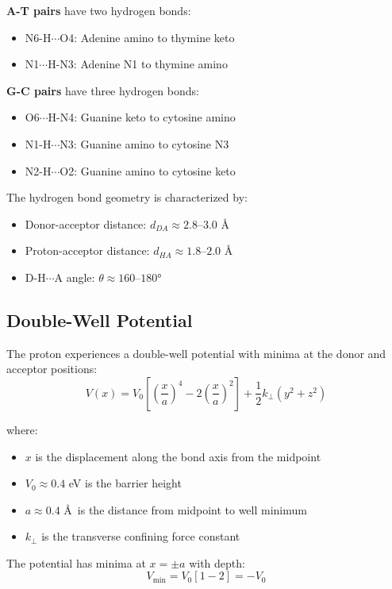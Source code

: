 \documentclass[twocolumn,10pt]{article}
\theoremstyle{remark}
\begin{document}
\textbf{A-T pairs} have two hydrogen bonds:
\begin{itemize}
\item N6-H$\cdots$O4: Adenine amino to thymine keto
\item N1$\cdots$H-N3: Adenine N1 to thymine amino
\end{itemize}

\textbf{G-C pairs} have three hydrogen bonds:
\begin{itemize}
\item O6$\cdots$H-N4: Guanine keto to cytosine amino
\item N1-H$\cdots$N3: Guanine amino to cytosine N3
\item N2-H$\cdots$O2: Guanine amino to cytosine keto
\end{itemize}

The hydrogen bond geometry is characterized by:
\begin{itemize}
\item Donor-acceptor distance: $d_{DA} \approx 2.8$--$3.0$ \AA
\item Proton-acceptor distance: $d_{HA} \approx 1.8$--$2.0$ \AA
\item D-H$\cdots$A angle: $\theta \approx 160$--$180°$
\end{itemize}

\subsection{Double-Well Potential}

The proton experiences a double-well potential with minima at the donor and acceptor positions:
\begin{equation}
V(x) = V_0 \left[ \left(\frac{x}{a}\right)^4 - 2\left(\frac{x}{a}\right)^2 \right] + \frac{1}{2}k_{\perp}(y^2 + z^2)
\end{equation}

where:
\begin{itemize}
\item $x$ is the displacement along the bond axis from the midpoint
\item $V_0 \approx 0.4$ eV is the barrier height
\item $a \approx 0.4$ \AA\ is the distance from midpoint to well minimum
\item $k_{\perp}$ is the transverse confining force constant
\end{itemize}

The potential has minima at $x = \pm a$ with depth:
\begin{equation}
V_{\min} = V_0 \left[ 1 - 2 \right] = -V_0
\end{equation}
\end{document}
